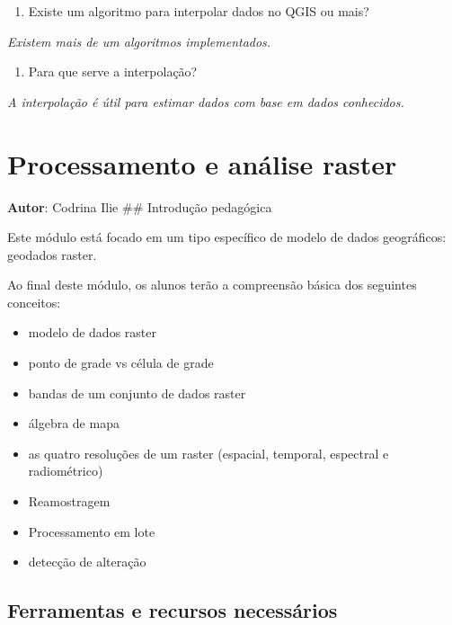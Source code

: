 \documentclass[
]{book}
\providecommand{\tightlist}{%
  \setlength{\itemsep}{0pt}\setlength{\parskip}{0pt}}
\begin{document}
\begin{enumerate}
\def\labelenumi{\arabic{enumi}.}
\tightlist
\item
  Existe um algoritmo para interpolar dados no QGIS ou mais?
\end{enumerate}

\emph{Existem mais de um algoritmos implementados.}

\begin{enumerate}
\def\labelenumi{\arabic{enumi}.}
\setcounter{enumi}{1}
\tightlist
\item
  Para que serve a interpolação?
\end{enumerate}

\emph{A interpolação é útil para estimar dados com base em dados conhecidos.}

\hypertarget{processamento-e-anuxe1lise-raster}{%
\chapter{\texorpdfstring{\textbf{Processamento e análise raster}}{Processamento e análise raster}}\label{processamento-e-anuxe1lise-raster}}

\textbf{Autor}: Codrina Ilie
\#\# Introdução pedagógica

Este módulo está focado em um tipo específico de modelo de dados geográficos: geodados raster.

Ao final deste módulo, os alunos terão a compreensão básica dos seguintes conceitos:

\begin{itemize}
\tightlist
\item
  modelo de dados raster
\item
  ponto de grade vs célula de grade
\item
  bandas de um conjunto de dados raster
\item
  álgebra de mapa
\item
  as quatro resoluções de um raster (espacial, temporal, espectral e radiométrico)
\item
  Reamostragem
\item
  Processamento em lote
\item
  detecção de alteração
\end{itemize}

\hypertarget{ferramentas-e-recursos-necessuxe1rios-8}{%
\section{Ferramentas e recursos necessários}\label{ferramentas-e-recursos-necessuxe1rios-8}}
\end{document}
